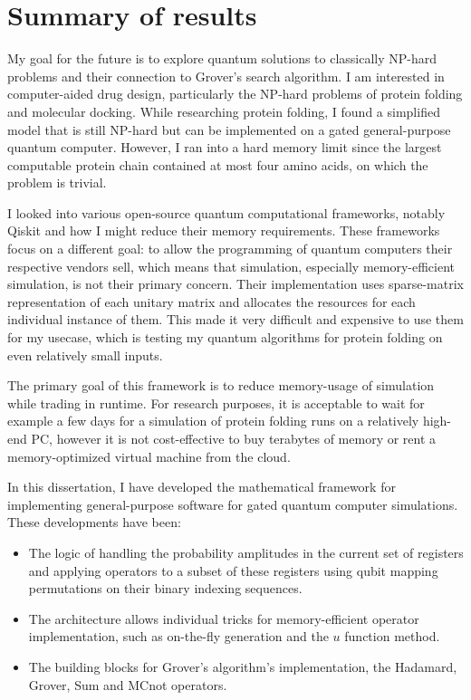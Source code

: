 \chapter{Summary of results}

My goal for the future is to explore quantum solutions to classically NP-hard problems and their connection to Grover's search algorithm. I am interested in computer-aided drug design, particularly the NP-hard problems of protein folding and molecular docking. While researching protein folding, I found a simplified model that is still NP-hard but can be implemented on a gated general-purpose quantum computer. However, I ran into a hard memory limit since the largest computable protein chain contained at most four amino acids, on which the problem is trivial.

I looked into various open-source quantum computational frameworks, notably Qiskit and how I might reduce their memory requirements. These frameworks focus on a different goal: to allow the programming of quantum computers their respective vendors sell, which means that simulation, especially memory-efficient simulation, is not their primary concern. Their implementation uses sparse-matrix representation of each unitary matrix and allocates the resources for each individual instance of them. This made it very difficult and expensive to use them for my usecase, which is testing my quantum algorithms for protein folding on even relatively small inputs.

The primary goal of this framework is to reduce memory-usage of simulation while trading in runtime. For research purposes, it is acceptable to wait for example a few days for a simulation of protein folding runs on a relatively high-end PC, however it is not cost-effective to buy terabytes of memory or rent a memory-optimized virtual machine from the cloud.

In this dissertation, I have developed the mathematical framework for implementing general-purpose software for gated quantum computer simulations. These developments have been:

\begin{itemize}
    \item The logic of handling the probability amplitudes in the current set of registers and applying operators to a subset of these registers using qubit mapping permutations on their binary indexing sequences.
    \item The architecture allows individual tricks for memory-efficient operator implementation, such as on-the-fly generation and the $u$ function method.
    \item The building blocks for Grover's algorithm's implementation, the Hadamard, Grover, Sum and MCnot operators.
\end{itemize}

